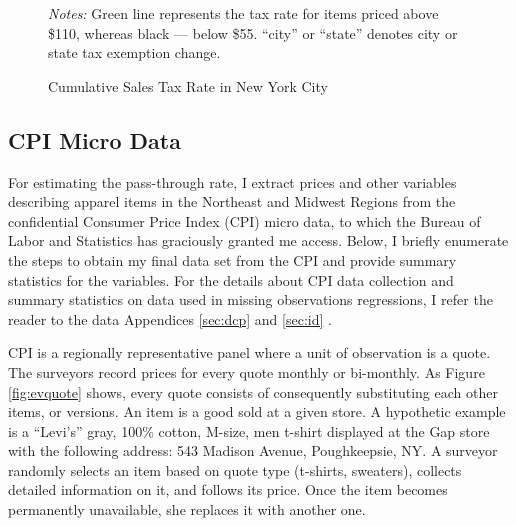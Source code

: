 \documentclass[12pt]{article}
\begin{document}
\begin{figure}
			\caption{Cumulative Sales Tax Rate in New York City }
			
			\medskip
			\begin{minipage}{1\textwidth}
				{ \small \emph{Notes:} Green line represents the tax rate for items priced above \$110, whereas black --- below \$55. ``city'' or ``state'' denotes city or state tax exemption change.}
			\end{minipage}	
			\label{fig:nyrates}
		\end{figure}	
		
	
	
	
	

	
	

		
		
		\subsection{CPI Micro Data}
		
		For estimating the pass-through rate, I extract prices and other variables describing apparel items in the Northeast and Midwest Regions from  the confidential Consumer Price Index (CPI) micro data, to which the Bureau of Labor and Statistics has graciously granted me access. 	
		Below, I briefly enumerate the steps to obtain my final data set from the CPI and provide summary statistics for the variables. For the details about CPI data collection and summary statistics on data used in missing observations regressions, I refer the reader to the data Appendices \ref{sec:dcp} and \ref{sec:id} .
		
		CPI is a regionally representative panel where a unit of observation is a quote. The surveyors record prices for every quote monthly or bi-monthly. As Figure \ref{fig:evquote} shows, every quote consists of consequently substituting each other items, or versions. An item is a good sold at a given store. A hypothetic example is a ``Levi's'' gray, 100\% cotton, M-size, men t-shirt displayed at the Gap store with the following address: 543 Madison Avenue, Poughkeepsie, NY.  A surveyor randomly selects an item based on quote type (t-shirts, sweaters), collects detailed information on it, and follows its price. Once the item becomes permanently unavailable, she replaces it with another one.
		
\end{document}
